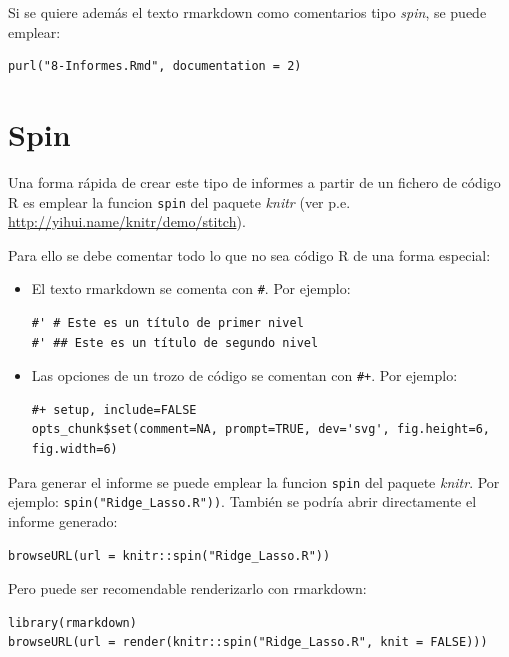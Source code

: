 \documentclass[]{book}
\begin{document}
Si se quiere además el texto rmarkdown como comentarios tipo \emph{spin}, se puede emplear:

\begin{verbatim}
purl("8-Informes.Rmd", documentation = 2)
\end{verbatim}

\hypertarget{spin}{%
\section{Spin}\label{spin}}

Una forma rápida de crear este tipo de informes a partir de un fichero de código R es emplear la funcion
\texttt{spin} del paquete \emph{knitr} (ver p.e. \url{http://yihui.name/knitr/demo/stitch}).

Para ello se debe comentar todo lo que no sea código R de una forma especial:

\begin{itemize}
\item
  El texto rmarkdown se comenta con \texttt{\#\textquotesingle{}}. Por ejemplo:

\begin{verbatim}
#' # Este es un título de primer nivel
#' ## Este es un título de segundo nivel
\end{verbatim}
\item
  Las opciones de un trozo de código se comentan con \texttt{\#+}. Por ejemplo:

\begin{verbatim}
#+ setup, include=FALSE
opts_chunk$set(comment=NA, prompt=TRUE, dev='svg', fig.height=6, fig.width=6)
\end{verbatim}
\end{itemize}

Para generar el informe se puede emplear la funcion \texttt{spin} del paquete \emph{knitr}. Por ejemplo: \texttt{spin("Ridge\_Lasso.R"))}.
También se podría abrir directamente el informe generado:

\begin{verbatim}
browseURL(url = knitr::spin("Ridge_Lasso.R"))
\end{verbatim}

Pero puede ser recomendable renderizarlo con rmarkdown:

\begin{verbatim}
library(rmarkdown)
browseURL(url = render(knitr::spin("Ridge_Lasso.R", knit = FALSE)))
\end{verbatim}
\end{document}
